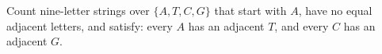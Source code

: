 Count nine-letter strings over $\{A,T,C,G\}$ that start with $A$, have no equal adjacent letters, and satisfy: every $A$ has an adjacent $T$, and every $C$ has an adjacent $G$.
